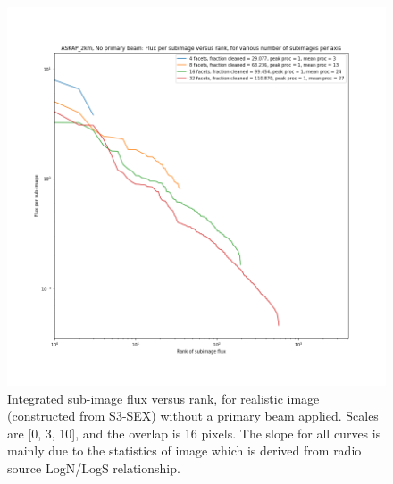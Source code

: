 \documentclass[11pt,a4paper,variablewidth]{article}
\begin{document}
\begin{figure}[H]
  \centering
  \includegraphics[width=\textwidth]{./fluxes_without_pb_ASKAP_2km.png}
  \caption{Integrated sub-image flux versus rank, for realistic image (constructed from S3-SEX) without a primary beam applied. Scales are [0, 3, 10], and the overlap is 16 pixels. The slope for all curves is mainly due to the statistics of image which is derived from radio source LogN/LogS relationship.}
  \label{fig:fluxes_without_pb}
\end{figure}
\end{document}
